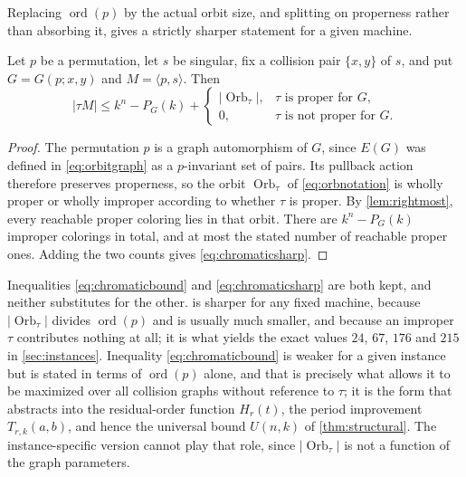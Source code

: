 \documentclass[11pt,a4paper]{article}
\numberwithin{equation}{section}
\theoremstyle{definition}
\theoremstyle{remark}
\newcommand{\ord}{\operatorname{ord}}
\newcommand{\Orb}{\operatorname{Orb}}
\begin{document}
Replacing $\ord(p)$ by the actual orbit size, and splitting on properness
rather than absorbing it, gives a strictly sharper statement for a given
machine.

\begin{proposition}\label{prop:chromatic}
Let $p$ be a permutation, let $s$ be singular, fix a collision pair
$\{x,y\}$ of $s$, and put $G=G(p;x,y)$ and $M=\langle p,s\rangle$. Then
\begin{equation}\label{eq:chromaticsharp}
 |\tau M|\le k^n-P_G(k)+
 \begin{cases}
  |\Orb_\tau|,&\tau\text{ is proper for }G,\\
  0,&\tau\text{ is not proper for }G.
 \end{cases}
\end{equation}
\end{proposition}
\begin{proof}
The permutation $p$ is a graph automorphism of $G$, since $E(G)$ was defined
in \eqref{eq:orbitgraph} as a $p$-invariant set of pairs. Its pullback
action therefore preserves properness, so the orbit $\Orb_\tau$ of
\eqref{eq:orbnotation} is wholly proper or wholly improper according to
whether $\tau$ is proper. By \cref{lem:rightmost}, every reachable proper
coloring lies in that orbit. There are $k^n-P_G(k)$ improper colorings in
total, and at most the stated number of reachable proper ones. Adding the two
counts gives \eqref{eq:chromaticsharp}.
\end{proof}

\begin{remark}\label{rem:twochromatic}
Inequalities \eqref{eq:chromaticbound} and \eqref{eq:chromaticsharp} are both
kept, and neither substitutes for the other.
 is sharper for any fixed machine, because
$|\Orb_\tau|$ divides $\ord(p)$ and is usually much smaller, and because an
improper $\tau$ contributes nothing at all; it is what yields the exact
values $24$, $67$, $176$ and $215$ in \cref{sec:instances}.
Inequality \eqref{eq:chromaticbound} is weaker for a given instance but is
stated in terms of $\ord(p)$ alone, and that is precisely what allows it to
be maximized over all collision graphs without reference to $\tau$; it is the
form that abstracts into the residual-order function $H_r(t)$, the period
improvement $T_{r,k}(a,b)$, and hence the universal bound $U(n,k)$ of
\cref{thm:structural}. The instance-specific version cannot play that role,
since $|\Orb_\tau|$ is not a function of the graph parameters.
\end{remark}
\end{document}
